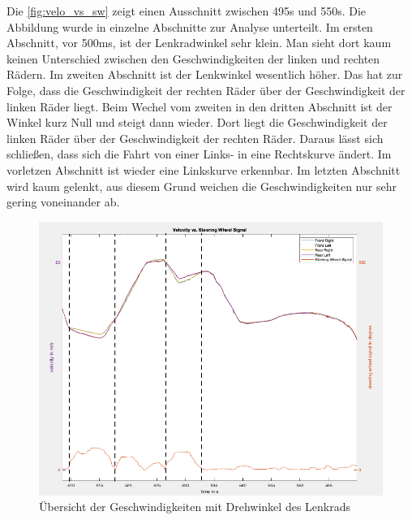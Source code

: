 	Die \autoref{fig:velo_vs_sw} zeigt einen Ausschnitt zwischen 495s und 550s. Die Abbildung wurde in einzelne Abschnitte zur Analyse unterteilt. Im ersten Abschnitt, vor 500ms, ist der Lenkradwinkel sehr klein. Man sieht dort kaum keinen Unterschied zwischen den Geschwindigkeiten der linken und rechten Rädern. Im zweiten Abschnitt ist der Lenkwinkel wesentlich höher. Das hat zur Folge, dass die Geschwindigkeit der rechten Räder über der Geschwindigkeit der linken Räder liegt. Beim Wechel vom zweiten in den dritten Abschnitt ist der Winkel kurz Null und steigt dann wieder. Dort liegt die Geschwindigkeit der linken Räder über der Geschwindigkeit der rechten Räder. Daraus lässt sich schließen, dass sich die Fahrt von einer Links- in eine Rechtskurve ändert. Im vorletzen Abschnitt ist wieder eine Linkskurve erkennbar. Im letzten Abschnitt wird kaum gelenkt, aus diesem Grund weichen die Geschwindigkeiten nur sehr gering voneinander ab.
	\begin{figure}[h!]
		\centering
		\includegraphics[width=1\linewidth]{../Graphiken/velo_vs_sw}
		\caption{Übersicht der Geschwindigkeiten mit Drehwinkel des Lenkrads}
		\label{fig:velo_vs_sw}
	\end{figure}
